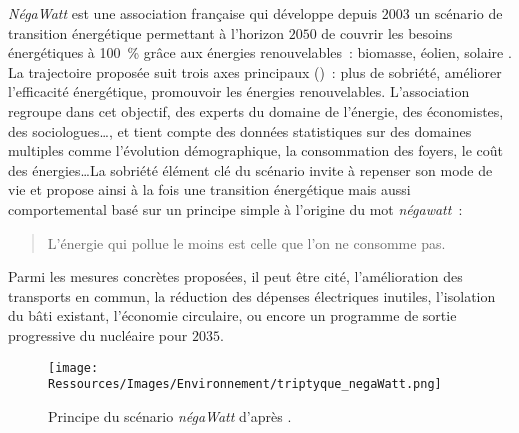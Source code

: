 \textit{NégaWatt} est une association française qui développe depuis $2003$ un scénario de
transition énergétique permettant à l’horizon $2050$ de couvrir les besoins énergétiques à
\SI{100}{\percent} grâce aux énergies renouvelables~: biomasse, éolien, solaire \parencite{negaWatt2017}. La
trajectoire proposée suit trois axes principaux ()~: plus de
sobriété, améliorer l’efficacité énergétique, promouvoir les énergies renouvelables.
L’association regroupe dans cet objectif, des experts du domaine de l’énergie, des
économistes, des sociologues\dots, et tient compte des données statistiques sur des
domaines multiples comme l’évolution démographique, la consommation des foyers, le coût
des énergies\dots La sobriété élément clé du scénario invite à repenser son mode de vie et
propose ainsi à la fois une transition énergétique mais aussi comportemental basé sur un
principe simple à l’origine du mot \textit{négawatt}~:
\blockquote{L’énergie qui pollue le moins est celle que l’on ne consomme pas.}
Parmi les mesures concrètes proposées, il peut être cité, l’amélioration des transports en
commun, la réduction des dépenses électriques inutiles, l’isolation du bâti existant,
l’économie circulaire, ou encore un programme de sortie progressive du nucléaire pour
$2035$.

\begin{figure}
    \centering
    \texttt{[image: Ressources/Images/Environnement/triptyque\_negaWatt.png]}
    \caption{Principe du scénario \textit{négaWatt} d’après \textcite{Salomon2012}.}
    \label{fig:negawatt_axes}
\end{figure}

